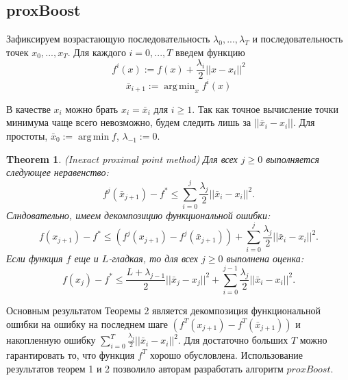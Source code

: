 \documentclass{article}
\DeclareMathOperator*{\argmin}{arg\,min}
\newtheorem{theorem}{Theorem}
\begin{document}
\subsection{proxBoost}
Зафиксируем возрастающую последовательность $\lambda_0, ..., \lambda_T$ и последовательность точек $x_0, ..., x_T$. Для каждого $i = 0, ..., T$ введем функцию 
\[f^i(x):=f(x) + \frac{\lambda_i}{2}||x - x_i||^2\]
\[\bar{x}_{i + 1} := \argmin_x f^i (x)\]

В качестве $x_i$ можно брать $x_i = \bar{x}_i$ для $i \ge 1$. Так как точное вычисление точки минимума чаще всего невозможно, будем следить лишь за $||\bar{x}_i - x_i||$. Для простоты, $\bar{x}_0 := \argmin f$, $\lambda_{-1} := 0$.

\begin{theorem}
    (Inexact proximal point method) Для всех $j \ge 0$ выполняется следующее неравенство:
    \[f^j(\bar{x}_{j + 1}) - f^* \le \sum_{i = 0}^{j}\frac{\lambda_j}{2}||\bar{x}_i - x_i||^2.\]
    Слндовательно, имеем декомпозицию функциональной ошибки:
    \[f(x_{j + 1}) - f^* \le (f^j(x_{j + 1}) - f^j(\bar{x}_{j + 1})) + \sum_{i = 0}^{j}\frac{\lambda_j}{2}||\bar{x}_i - x_i||^2.\]
    Если функция $f$ еще и $L$-гладкая, то для всех $j \ge 0$ выполнена оценка:
    \[f(x_j) - f^* \le \frac{L + \lambda_{j - 1}}{2} ||\bar{x}_j - x_j||^2 + \sum_{i = 0}^{j - 1}\frac{\lambda_j}{2}||\bar{x}_i - x_i||^2.\]
\end{theorem}

Основным результатом Теоремы 2 является декомпозиция функциональной ошибки на ошибку на последнем шаге $(f^T(x_{j + 1}) - f^T(\bar{x}_{j + 1}))$ и накопленную ошибку $\sum_{i = 0}^{T}\frac{\lambda_j}{2}||\bar{x}_i - x_i||^2$. Для достаточно больших $T$ можно гарантировать то, что функция $f^T$ хорошо обусловлена. Использование результатов теорем 1 и 2 позволило авторам \cite{davis2021low} разработать алгоритм $proxBoost$.
\end{document}
